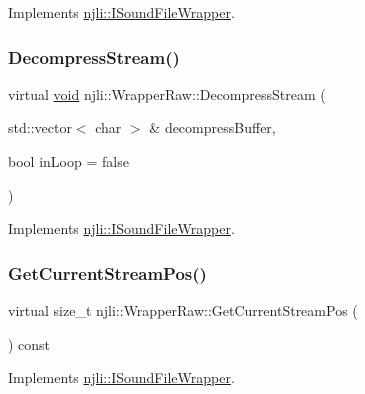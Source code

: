 Implements \mbox{\hyperlink{classnjli_1_1_i_sound_file_wrapper_a9b338a5bbcb5d07acdebce1efab332c5}{njli\+::\+I\+Sound\+File\+Wrapper}}.

\mbox{\label{classnjli_1_1_wrapper_raw_a25b25679205b828a096535b40f3082be}} 
\subsubsection{\texorpdfstring{Decompress\+Stream()}{DecompressStream()}}
{\footnotesize\ttfamily virtual \mbox{\hyperlink{_thread_8h_af1e856da2e658414cb2456cb6f7ebc66}{void}} njli\+::\+Wrapper\+Raw\+::\+Decompress\+Stream (\begin{DoxyParamCaption}\item[{std\+::vector$<$ char $>$ \&}]{decompress\+Buffer,  }\item[{bool}]{in\+Loop = {\ttfamily false} }\end{DoxyParamCaption})\hspace{0.3cm}{\ttfamily [virtual]}}



Implements \mbox{\hyperlink{classnjli_1_1_i_sound_file_wrapper_a2e62b8b05da06eb1f9594ffdd5aa0cfd}{njli\+::\+I\+Sound\+File\+Wrapper}}.

\mbox{\label{classnjli_1_1_wrapper_raw_a66e31271020e3b7e7c48ecda73ed0351}} 
\subsubsection{\texorpdfstring{Get\+Current\+Stream\+Pos()}{GetCurrentStreamPos()}}
{\footnotesize\ttfamily virtual size\+\_\+t njli\+::\+Wrapper\+Raw\+::\+Get\+Current\+Stream\+Pos (\begin{DoxyParamCaption}{ }\end{DoxyParamCaption}) const\hspace{0.3cm}{\ttfamily [virtual]}}



Implements \mbox{\hyperlink{classnjli_1_1_i_sound_file_wrapper_a7468aaf1e53cfd6feb38eae4ecf8ab99}{njli\+::\+I\+Sound\+File\+Wrapper}}.

